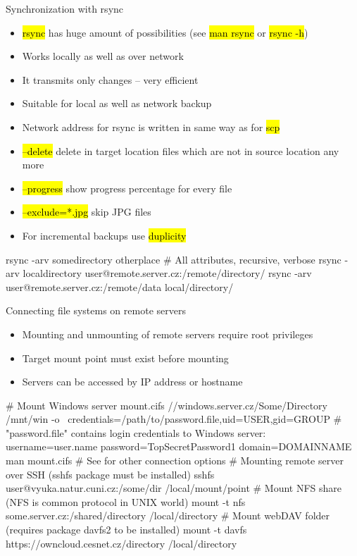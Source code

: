 \documentclass[compress, ucs, xelatex, 11pt, xcolor=svgnames,
  hyperref={
    bookmarks=true,
    unicode=true,
    colorlinks=true,
    pdftitle={Linux, command line and MetaCentrum},
    plainpages=false,
    pdfauthor={Vojtech Zeisek},
    pdfsubject={Course about use of Linux command line, writing shell scripts and using MetaCentrum of CESNET},
    pdfcreator={XeLaTeX},
    pdfkeywords={Linux, GNU, BASH, shell, command line, MetaCentrum},
    linkcolor=DarkRed,
    anchorcolor=DarkBlue,
    citecolor=Indigo,
    filecolor=NavyBlue,
    menucolor=DarkMagenta,
    urlcolor=DarkBlue,
    pdftex},
  url={hyphens, lowtilde} %
  ]{beamer}
\renewcommand{\texttt}[1]{\hl{\ttfamily #1}}
\begin{document}
\begin{frame}[fragile]{Synchronization with rsync}
  \begin{itemize}
    \item \texttt{rsync} has huge amount of possibilities (see \texttt{man rsync} or \texttt{rsync -h})
    \item Works locally as well as over network
    \item It transmits only changes -- very efficient
    \item Suitable for local as well as network backup
    \item Network address for rsync is written in same way as for \texttt{scp}
    \item \texttt{--delete} delete in target location files which are not in source location any more
    \item \texttt{--progress} show progress percentage for every file
    \item \texttt{--exclude=*.jpg} skip JPG files
    \item For incremental backups use \texttt{duplicity}
  \end{itemize}
  \begin{bashcode}
    rsync -arv somedirectory otherplace # All attributes, recursive, verbose
    rsync -arv localdirectory user@remote.server.cz:/remote/directory/
    rsync -arv user@remote.server.cz:/remote/data local/directory/
  \end{bashcode}
\end{frame}

\begin{frame}[fragile]{Connecting file systems on remote servers}
  \begin{itemize}
    \item Mounting and unmounting of remote servers require root privileges
    \item Target mount point must exist before mounting
    \item Servers can be accessed by IP address or hostname
  \end{itemize}
  \begin{bashcode}
    # Mount Windows server
    mount.cifs //windows.server.cz/Some/Directory /mnt/win -o \
      credentials=/path/to/password.file,uid=USER,gid=GROUP
    # "password.file" contains login credentials to Windows server:
    username=user.name
    password=TopSecretPassword1
    domain=DOMAINNAME
    man mount.cifs # See for other connection options
    # Mounting remote server over SSH (sshfs package must be installed)
    sshfs user@vyuka.natur.cuni.cz:/some/dir /local/mount/point
    # Mount NFS share (NFS is common protocol in UNIX world)
    mount -t nfs some.server.cz:/shared/directory /local/directory
    # Mount webDAV folder (requires package davfs2 to be installed)
    mount -t davfs https://owncloud.cesnet.cz/directory /local/directory
  \end{bashcode}
\end{frame}
\end{document}
